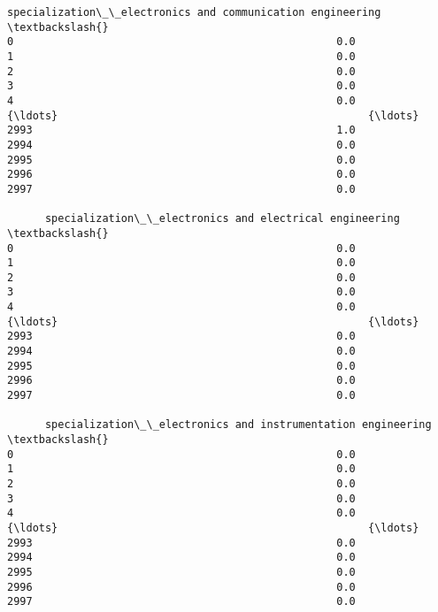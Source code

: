 \documentclass[11pt]{article}
\begin{document}
\begin{Verbatim}[commandchars=\\\{\}]
      specialization\_\_electronics and communication engineering  \textbackslash{}
0                                                   0.0           
1                                                   0.0           
2                                                   0.0           
3                                                   0.0           
4                                                   0.0           
{\ldots}                                                 {\ldots}           
2993                                                1.0           
2994                                                0.0           
2995                                                0.0           
2996                                                0.0           
2997                                                0.0           

      specialization\_\_electronics and electrical engineering  \textbackslash{}
0                                                   0.0        
1                                                   0.0        
2                                                   0.0        
3                                                   0.0        
4                                                   0.0        
{\ldots}                                                 {\ldots}        
2993                                                0.0        
2994                                                0.0        
2995                                                0.0        
2996                                                0.0        
2997                                                0.0        

      specialization\_\_electronics and instrumentation engineering  \textbackslash{}
0                                                   0.0             
1                                                   0.0             
2                                                   0.0             
3                                                   0.0             
4                                                   0.0             
{\ldots}                                                 {\ldots}             
2993                                                0.0             
2994                                                0.0             
2995                                                0.0             
2996                                                0.0             
2997                                                0.0             


\end{Verbatim}
\end{document}
